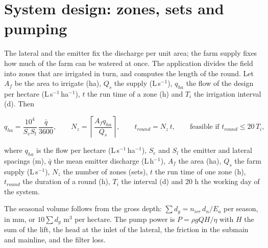 \section{System design: zones, sets and pumping}
The lateral and the emitter fix the discharge per unit area; the farm supply fixes how much of the farm can be watered at once. The application divides the field into zones that are irrigated in turn, and computes the length of the round. Let $A_f$ be the area to irrigate (ha), $Q_s$ the supply (L\,s$^{-1}$), $q_{ha}$ the flow of the design per hectare (L\,s$^{-1}$\,ha$^{-1}$), $t$ the run time of a zone (h) and $T_i$ the irrigation interval (d). Then

\begin{equation}q_{ha}=\frac{10^{4}}{S_eS_l}\,\frac{\bar q}{3600},\qquad N_z=\left\lceil\frac{A_fq_{ha}}{Q_s}\right\rceil,\qquad t_{round}=N_z\,t,\qquad \text{feasible if }t_{round}\le 20\,T_i,\label{eq:d-zone}\end{equation}
\par\noindent where $q_{ha}$ is the flow per hectare (L\,s$^{-1}$\,ha$^{-1}$), $S_e$ and $S_l$ the emitter and lateral spacings (m), $\bar q$ the mean emitter discharge (L\,h$^{-1}$), $A_f$ the area (ha), $Q_s$ the farm supply (L\,s$^{-1}$), $N_z$ the number of zones (sets), $t$ the run time of one zone (h), $t_{round}$ the duration of a round (h), $T_i$ the interval (d) and 20 h the working day of the system.



The seasonal volume follows from the gross depth: $\sum d_g=n_{irr}\,d_n/E_a$ per season, in mm, or $10\sum d_g$ m$^3$ per hectare. The pump power is $P=\rho gQH/\eta$ with $H$ the sum of the lift, the head at the inlet of the lateral, the friction in the submain and mainline, and the filter loss.

